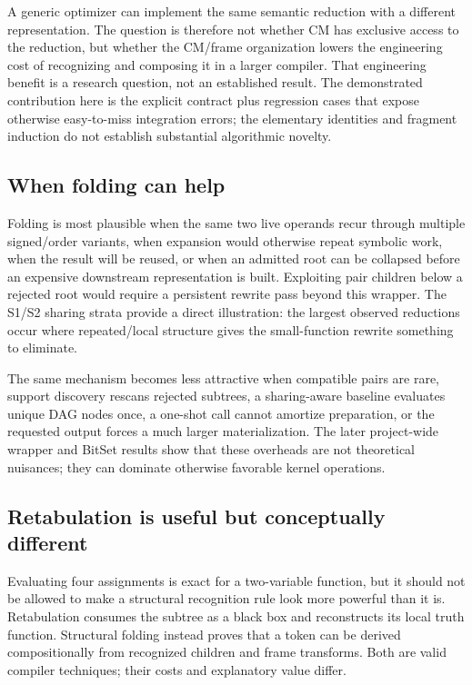 \documentclass[10pt]{article}
\theoremstyle{plain}
\theoremstyle{definition}
\theoremstyle{remark}
\begin{document}
A generic optimizer can implement the same semantic reduction with a different representation. The question is therefore not whether CM has exclusive access to the reduction, but whether the CM/frame organization lowers the engineering cost of recognizing and composing it in a larger compiler. That engineering benefit is a research question, not an established result. The demonstrated contribution here is the explicit contract plus regression cases that expose otherwise easy-to-miss integration errors; the elementary identities and fragment induction do not establish substantial algorithmic novelty.

\subsection{When folding can help}

Folding is most plausible when the same two live operands recur through multiple signed/order variants, when expansion would otherwise repeat symbolic work, when the result will be reused, or when an admitted root can be collapsed before an expensive downstream representation is built. Exploiting pair children below a rejected root would require a persistent rewrite pass beyond this wrapper. The S1/S2 sharing strata provide a direct illustration: the largest observed reductions occur where repeated/local structure gives the small-function rewrite something to eliminate.

The same mechanism becomes less attractive when compatible pairs are rare, support discovery rescans rejected subtrees, a sharing-aware baseline evaluates unique DAG nodes once, a one-shot call cannot amortize preparation, or the requested output forces a much larger materialization. The later project-wide wrapper and BitSet results show that these overheads are not theoretical nuisances; they can dominate otherwise favorable kernel operations.

\subsection{Retabulation is useful but conceptually different}

Evaluating four assignments is exact for a two-variable function, but it should not be allowed to make a structural recognition rule look more powerful than it is. Retabulation consumes the subtree as a black box and reconstructs its local truth function. Structural folding instead proves that a token can be derived compositionally from recognized children and frame transforms. Both are valid compiler techniques; their costs and explanatory value differ.
\end{document}
